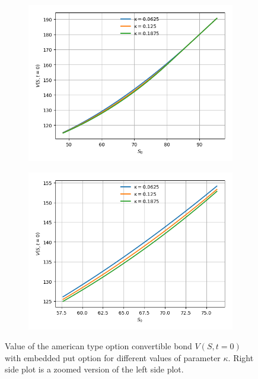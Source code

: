 \documentclass{article}
\begin{document}
\begin{figure}[!th]
\begin{minipage}{.5\textwidth}
  \centering
  \begin{subfigure}{\textwidth}
      \includegraphics[width=\textwidth,center]{../images/complete_american_varying_s_varying_k.png}
  \end{subfigure}
\end{minipage}
\begin{minipage}{.5\textwidth}
  \centering
  \begin{subfigure}{\textwidth}
      \includegraphics[width=\textwidth,center]{../images/american_varying_s_varying_k.png}
  \end{subfigure}
\end{minipage}
\caption{Value of the american type option convertible bond $V(S,t=0)$ with embedded put option for different values of parameter $\kappa$. Right side plot is a zoomed version of the left side plot.}
\label{fig:american_varying_s_varying_k}
\end{figure}
\end{document}
